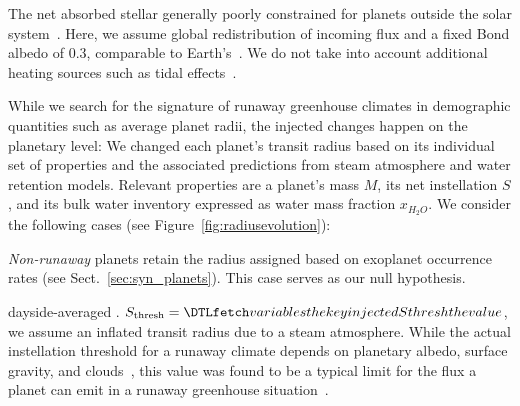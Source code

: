 \documentclass[twocolumn,twocolappendix,linenumbers]{aastex631}
\begin{document}
The net absorbed stellar  generally poorly constrained for planets outside the solar system~\citep[e.g.,][]{Angerhausen2015,Parmentier2018a,Mansfield2019}.
Here, we assume global redistribution of incoming flux and a fixed Bond albedo of $0.3$, comparable to Earth's~\citep{Haar1971}.
We do not take into account additional heating sources such as tidal effects~\citep[e.g.,][]{Barnes2013}.

While we search for the signature of runaway greenhouse climates in demographic quantities such as average planet radii, the injected changes happen on the planetary level: We changed each planet's transit radius based on its individual set of properties and the associated predictions from steam atmosphere and water retention models.
Relevant properties are a planet's mass $M$, its net instellation $S$, and its bulk water inventory expressed as  water mass fraction $x_{H_2O}$.
We consider the following cases (see Figure~\ref{fig:radiusevolution}):

\textit{Non-runaway} planets retain the radius assigned based on exoplanet occurrence rates (see Sect.~\ref{sec:syn_planets}).
This case serves as our null hypothesis.

 dayside-averaged .
 $S_\mathrm{thresh} = \var{injectedSthresh}$, we assume an inflated transit radius due to a steam atmosphere.
While the actual instellation threshold for a runaway climate depends on planetary albedo, surface gravity, and clouds~\citep{2019Icar..317..583P,Turbet2021,Pierrehumbert2022}, this value was found to be a typical limit for the flux a planet can emit in a runaway greenhouse situation~\citep{Goldblatt2013,Kopparapu2013,Leconte2013,Hamano2015,2017JGRE..122.1458S,2019ApJ...875...31K,Boukrouche2021,2021JGRE..12606711L}.
\end{document}
